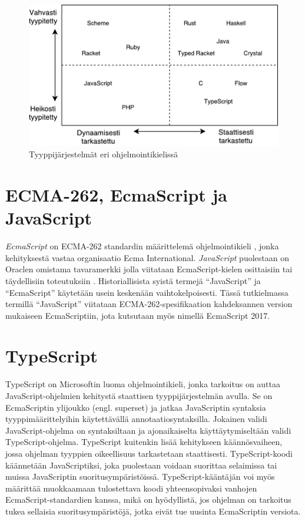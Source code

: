 \begin{figure}
\centering
\includegraphics{images/type-systems.pdf}
\caption{Tyyppijärjestelmät eri ohjelmointikielissä}
\end{figure}

\section{ECMA-262, EcmaScript ja JavaScript}
\textit{EcmaScript} on ECMA-262 standardin määrittelemä ohjelmointikieli
\cite{JavaScriptLanguageResources, Ecma262}, jonka kehityksestä vastaa
organisaatio Ecma International. \textit{JavaScript} puolestaan on Oraclen omistama
tavaramerkki jolla viitataan EcmaScript-kielen osittaisiin tai täydellisiin
toteutuksiin \cite{JavaScriptLanguageResources}. Historiallisista syistä termejä
``JavaScript'' ja ``EcmaScript'' käytetään usein keskenään vaihtokelpoisesti.
Tässä tutkielmassa termillä ``JavaScript'' viitataan ECMA-262-spesifikaation kahdeksannen
version mukaiseen EcmaScriptiin, jota kutsutaan myös nimellä EcmaScript 2017.

\section{TypeScript}
TypeScript on Microsoftin luoma ohjelmointikieli, jonka tarkoitus on
auttaa JavaScript-ohjelmien kehitystä staattisen tyyppijärjestelmän avulla.
Se on EcmaScriptin ylijoukko (engl. superset) \cite{TypeScriptSpec} ja jatkaa
JavaScriptin syntaksia tyyppimäärittelyihin käytettävällä
annotaatiosyntaksilla. Jokainen validi JavaScript-ohjelma on syntaksiltaan ja
ajonaikaiselta käyttäytymiseltään validi TypeScript-ohjelma. TypeScript
kuitenkin lisää kehitykseen käännösvaiheen, jossa ohjelman tyyppien
oikeellisuus tarkastetaan staattisesti. TypeScript-koodi käännetään
JavaScriptiksi, joka puolestaan voidaan suorittaa selaimissa tai muissa
JavaScriptin suoritusympäristöissä. TypeScript-kääntäjän voi myös määrittää
muokkaamaan tulostettava koodi yhteensopivaksi vanhojen
EcmaScript-standardien kanssa, mikä on hyödyllistä, jos ohjelman on tarkoitus
tukea sellaisia suoritusympäristöjä, jotka eivät tue uusinta EcmaScriptin
versiota.

